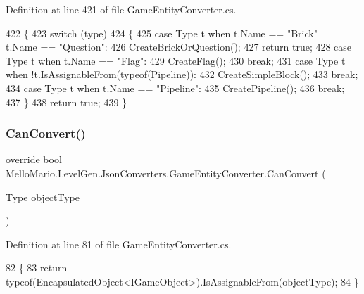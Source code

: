 Definition at line 421 of file Game\+Entity\+Converter.\+cs.


\begin{DoxyCode}
422         \{
423             \textcolor{keywordflow}{switch} (type)
424             \{
425                 \textcolor{keywordflow}{case} Type t when t.Name == \textcolor{stringliteral}{"Brick"} || t.Name == \textcolor{stringliteral}{"Question"}:
426                     CreateBrickOrQuestion();
427                     \textcolor{keywordflow}{return} \textcolor{keyword}{true};
428                 \textcolor{keywordflow}{case} Type t when t.Name == \textcolor{stringliteral}{"Flag"}:
429                     CreateFlag();
430                     \textcolor{keywordflow}{break};
431                 \textcolor{keywordflow}{case} Type t when !t.IsAssignableFrom(typeof(Pipeline)):
432                     CreateSimpleBlock();
433                     \textcolor{keywordflow}{break};
434                 \textcolor{keywordflow}{case} Type t when t.Name == \textcolor{stringliteral}{"Pipeline"}:
435                     CreatePipeline();
436                     \textcolor{keywordflow}{break};
437             \}
438             \textcolor{keywordflow}{return} \textcolor{keyword}{true};
439         \}
\end{DoxyCode}
\mbox{\label{classMelloMario_1_1LevelGen_1_1JsonConverters_1_1GameEntityConverter_af482f79824051035d93e0e6d9f7556cc}} 
\subsubsection{Can\+Convert()}
{\footnotesize\ttfamily override bool Mello\+Mario.\+Level\+Gen.\+Json\+Converters.\+Game\+Entity\+Converter.\+Can\+Convert (\begin{DoxyParamCaption}\item[{Type}]{object\+Type }\end{DoxyParamCaption})}



Definition at line 81 of file Game\+Entity\+Converter.\+cs.


\begin{DoxyCode}
82         \{
83             \textcolor{keywordflow}{return} typeof(EncapsulatedObject<IGameObject>).IsAssignableFrom(objectType);
84         \}
\end{DoxyCode}
\mbox{\label{classMelloMario_1_1LevelGen_1_1JsonConverters_1_1GameEntityConverter_a3a832fa94bbe1390575d204c5da2f6aa}} 
